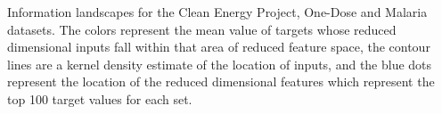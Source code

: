 Information landscapes for the Clean Energy Project, One-Dose and Malaria datasets.  
The colors represent the mean value of targets whose reduced dimensional inputs fall within that area of reduced feature space,
the contour lines are a kernel density estimate of the location of inputs, and the blue dots represent the location of the reduced
dimensional features which represent the top 100 target values for each set.
\label{fig:info_landscapes}
